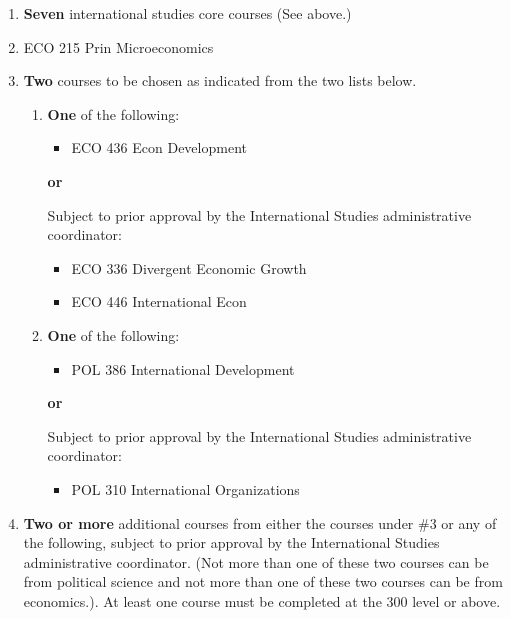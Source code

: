 \documentclass[
  letterpaper,
]{scrbook}
\providecommand{\tightlist}{%
  \setlength{\itemsep}{0pt}\setlength{\parskip}{0pt}}
\begin{document}
\begin{enumerate}
\def\labelenumi{\arabic{enumi}.}
\item
  \textbf{Seven} international studies core courses (See above.)
\item
  ECO 215 Prin Microeconomics
\item
  \textbf{Two} courses to be chosen as indicated from the two lists
  below.

  \begin{enumerate}
  \def\labelenumii{\alph{enumii}.}
  \item
    \textbf{One} of the following:

    \begin{itemize}
    \tightlist
    \item
      ECO 436 Econ Development
    \end{itemize}

    \textbf{or}

    Subject to prior approval by the International Studies
    administrative coordinator:

    \begin{itemize}
    \tightlist
    \item
      ECO 336 Divergent Economic Growth
    \item
      ECO 446 International Econ
    \end{itemize}
  \item
    \textbf{One} of the following:

    \begin{itemize}
    \tightlist
    \item
      POL 386 International Development
    \end{itemize}

    \textbf{or}

    Subject to prior approval by the International Studies
    administrative coordinator:

    \begin{itemize}
    \tightlist
    \item
      POL 310 International Organizations
    \end{itemize}
  \end{enumerate}
\item
  \textbf{Two or more} additional courses from either the courses under
  \#3 or any of the following, subject to prior approval by the
  International Studies administrative coordinator. (Not more than one
  of these two courses can be from political science and not more than
  one of these two courses can be from economics.). At least one course
  must be completed at the 300 level or above.


\end{enumerate}
\end{document}
